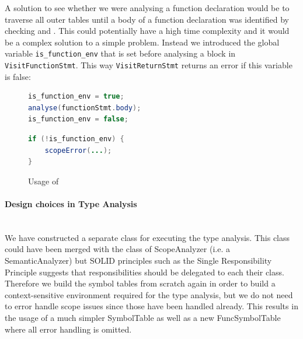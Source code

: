 A solution to see whether we were analysing a function declaration would be to traverse all outer tables until a body of a function declaration was identified by checking  and .
This could potentially have a high time complexity and it would be a complex solution to a simple problem. Instead we introduced the global variable \verb|is_function_env| that is set before analysing a block in \verb|VisitFunctionStmt|. 
This way \verb|VisitReturnStmt| returns an error if this variable is false:
\begin{figure}[H]
\centering
    \begin{minipage}[]{0.38\textwidth}
        \begin{lstlisting}[language=java, caption={\texttt{\code{VisitFunctionStmt}}}]
is_function_env = true;
analyse(functionStmt.body);
is_function_env = false;\end{lstlisting}
    \end{minipage}
\hfill
    \begin{minipage}[]{0.5\textwidth}
        \begin{lstlisting}[language=java, caption={\texttt{\code{VisitReturnStmt}}}]
if (!is_function_env) {
    scopeError(...);
}\end{lstlisting}
    \end{minipage}
\caption{Usage of }
\end{figure}
\paragraph{Design choices in Type Analysis}\mbox{}\\
We have constructed a separate class for executing the type analysis. This class could have been merged with the class of ScopeAnalyzer (i.e. a SemanticAnalyzer) but SOLID principles such as the Single Responsibility Principle suggests that responsibilities should be delegated to each their class.
Therefore we build the symbol tables from scratch again in order to build a context-sensitive environment required for the type analysis, but we do not need to error handle scope issues since those have been handled already.
This results in the usage of a much simpler SymbolTable as well as a new FuncSymbolTable where all error handling is omitted. 

